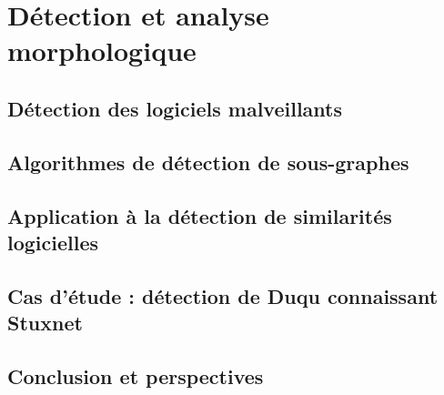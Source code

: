 % 

\part{Détection et analyse morphologique}

\DontFrameThisInToc
\chapter{\prefchap Détection des logiciels malveillants\label{chap:detection}}


\DontFrameThisInToc
\chapter{\prefchap Algorithmes de détection de sous-graphes\label{chap:algos}}


\DontFrameThisInToc
\chapter{\prefchap Application à la détection de similarités logicielles\label{chap:libs}}


\DontFrameThisInToc
\chapter{\prefchap Cas d'étude : détection de Duqu connaissant Stuxnet\label{chap:duqu-stux}}


\DontFrameThisInToc
\chapter*{Conclusion et perspectives\label{chap:conclusion}}


\PutLineInToc

\PrintIndex

